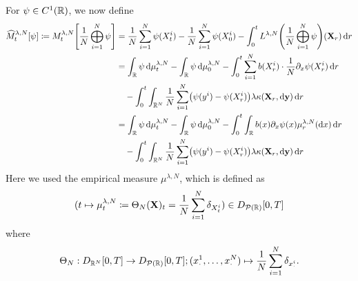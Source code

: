 \documentclass{article}
\begin{document}
\noindent For \(\psi \in C^1(\mathbb{R})\), we now define
\begin{equation}\label{eq:hat-M-derivation-start}
\begin{split}
    \widehat{M}_t^{\lambda, N}[\psi] \coloneqq
    M_t^{\lambda, N}\sbr*{\frac{1}{N} \bigoplus_{i=1}^N \psi}
    &= \frac{1}{N} \sum_{i=1}^N \psi(X_t^i) - \frac{1}{N} \sum_{i=1}^N \psi(X_0^i) - \int_0^t L^{\lambda, N} \br*{\frac{1}{N}\bigoplus_{i=1}^N \psi} (\bm{X}_r) \odif{r} \\
    &= \int_\potspace \psi \odif{\mu_t^{\lambda, N}} - \int_\potspace \psi \odif{\mu_0^{\lambda, N}}
    - \int_0^t \sum_{i=1}^N b(X_{r}^i) \cdot \frac{1}{N} \partial_{x} \psi(X_{r}^i) \odif{r} \\
    &\quad - \int_0^t \int_{\potspace^N} \frac{1}{N} \sum_{i=1}^N \br*{ \psi(y^i) - \psi(X_{r}^i) } \lambda \kappa(\bm{X}_r, \odif{\bm{y}}) \odif{r} \\
    &= \int_\potspace \psi \odif{\mu_t^{\lambda, N}} - \int_\potspace \psi \odif{\mu_0^{\lambda, N}}
    - \int_0^t \int_\potspace b(x) \partial_{x} \psi(x) \mu_r^{\lambda, N}(\odif{x}) \odif{r} \\
    &\quad - \int_0^t \int_{\potspace^N} \frac{1}{N} \sum_{i=1}^N \br*{ \psi(y^i) - \psi(X_{r}^i) } \lambda \kappa(\bm{X}_r, \odif{\bm{y}}) \odif{r} \\
\end{split}
\end{equation}
Here we used the empirical measure $\mu^{\lambda,N}$, which is defined as
\begin{equation}
    \lparen t \mapsto \mu_t^{\lambda, N} \coloneqq \Theta_N(\mathbf{X})_t = \frac{1}{N} \sum_{i=1}^N \delta_{X_t^i} \rparen \in D_{\mathcal{P}(\mathbb{R})}[0,T]
\end{equation}
where
\begin{equation}
    \Theta_N : D_{\mathbb{R}^N}[0,T] \to D_{\mathcal{P}(\mathbb{R})}[0,T]; (x_\cdot^1,\dots,x_\cdot^N) \mapsto \frac{1}{N} \sum_{i=1}^N \delta_{x_\cdot^i}.
\end{equation}
\end{document}

